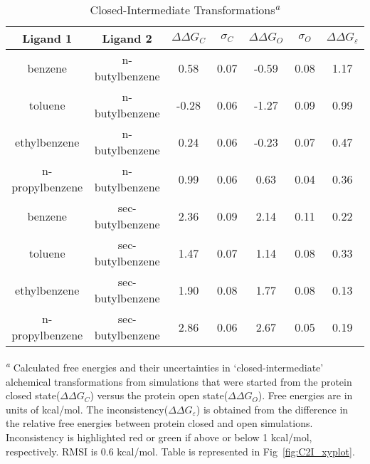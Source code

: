 \begin{table}[!htb]
\centering
\caption{Closed-Intermediate Transformations\textsuperscript{\emph{a}}}
\label{tbl:C-I}
\begin{tabular}{|c|c|c|c|c|c|c|}
\hline
\textbf{Ligand 1}   & \textbf{Ligand 2}    & \boldmath$\Delta\Delta G_{C}$ & \boldmath$\sigma_{C}$ & \boldmath$\Delta\Delta G_{O}$ & \boldmath$\sigma_{O}$ & \boldmath$\Delta\Delta G_{\varepsilon}$            \\ \hline
benzene         & n-butylbenzene   & 0.58    & 0.07  & -0.59  & 0.08  & \cellcolor[HTML]{FFCCC9}1.17 \\ \hline
toluene         & n-butylbenzene   & -0.28   & 0.06  & -1.27  & 0.09  & \cellcolor[HTML]{9AFF99}0.99 \\ \hline
ethylbenzene    & n-butylbenzene   & 0.24    & 0.06  & -0.23  & 0.07  & \cellcolor[HTML]{9AFF99}0.47 \\ \hline
n-propylbenzene & n-butylbenzene   & 0.99    & 0.06  & 0.63   & 0.04  & \cellcolor[HTML]{9AFF99}0.36 \\ \hline
benzene         & sec-butylbenzene & 2.36    & 0.09  & 2.14   & 0.11  & \cellcolor[HTML]{9AFF99}0.22 \\ \hline
toluene         & sec-butylbenzene & 1.47    & 0.07  & 1.14   & 0.08  & \cellcolor[HTML]{9AFF99}0.33 \\ \hline
ethylbenzene    & sec-butylbenzene & 1.90    & 0.08  & 1.77   & 0.08  & \cellcolor[HTML]{9AFF99}0.13 \\ \hline
n-propylbenzene & sec-butylbenzene & 2.86    & 0.06  & 2.67   & 0.05  & \cellcolor[HTML]{9AFF99}0.19 \\ \hline
\end{tabular}

\textsuperscript{\emph{a}} Calculated free energies and their uncertainties in `closed-intermediate' alchemical transformations from simulations that were started from the protein closed state(\boldmath$\Delta\Delta G_{C}$) versus the protein open state(\boldmath$\Delta\Delta G_{O}$).
Free energies are in units of kcal/mol. 
The inconsistency(\boldmath$\Delta\Delta G_{\varepsilon}$) is obtained from the difference in the relative free energies between protein closed and open simulations. 
Inconsistency is highlighted red or green if above or below 1 kcal/mol, respectively.
RMSI is 0.6 kcal/mol.
Table is represented in Fig~\ref{fig:C2I_xyplot}.
\end{table}

